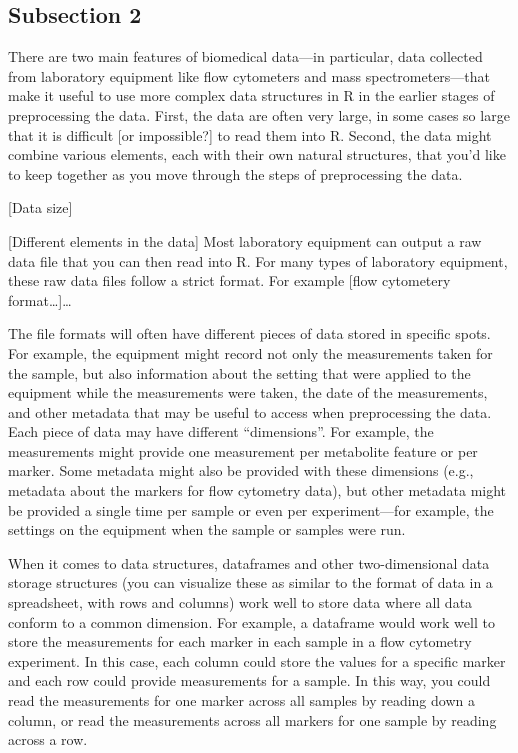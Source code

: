 \documentclass[]{tufte-book}
\begin{document}
\hypertarget{subsection-2}{%
\subsection{Subsection 2}\label{subsection-2}}

There are two main features of biomedical data---in particular, data collected from
laboratory equipment like flow cytometers and mass spectrometers---that make it
useful to use more complex data structures in R in the earlier stages of preprocessing
the data. First, the data are often very large, in some cases so large that it is
difficult {[}or impossible?{]} to read them into R. Second, the data might combine
various elements, each with their own natural structures, that you'd like to keep
together as you move through the steps of preprocessing the data.

{[}Data size{]}

{[}Different elements in the data{]}
Most laboratory equipment can output a raw data file that you can then read into R.
For many types of laboratory equipment, these raw data files follow a strict format.
For example {[}flow cytometery format\ldots{]}\ldots{}

The file formats will often have different pieces of data stored in specific spots.
For example, the equipment might record not only the measurements taken for the
sample, but also information about the setting that were applied to the equipment
while the measurements were taken, the date of the measurements, and other metadata
that may be useful to access when preprocessing the data. Each piece of data may
have different ``dimensions''. For example, the measurements might provide one
measurement per metabolite feature or per marker. Some metadata might also be
provided with these dimensions (e.g., metadata about the markers for flow
cytometry data), but other metadata might be provided a single time per sample
or even per experiment---for example, the settings on the equipment when the
sample or samples were run.

When it comes to data structures, dataframes and other two-dimensional data storage
structures (you can visualize these as similar to the format of data in a spreadsheet,
with rows and columns) work well to store data where all data conform to a common
dimension. For example, a dataframe would work well to store the measurements
for each marker in each sample in a flow cytometry experiment. In this case,
each column could store the values for a specific marker and each row could
provide measurements for a sample. In this way, you could read the measurements
for one marker across all samples by reading down a column, or read the measurements
across all markers for one sample by reading across a row.
\end{document}
